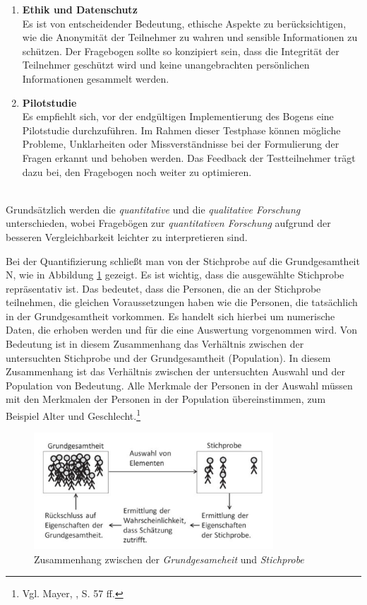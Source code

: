 \begin{enumerate}
    \item \textbf{Ethik und Datenschutz}\\
    Es ist von entscheidender Bedeutung, ethische Aspekte zu berücksichtigen, wie die Anonymität der Teilnehmer zu wahren
    und sensible Informationen zu schützen. Der Fragebogen sollte so konzipiert sein, dass die Integrität der Teilnehmer
    geschützt wird und keine unangebrachten persönlichen Informationen gesammelt werden.

    \item \textbf{Pilotstudie}\\
    Es empfiehlt sich, vor der endgültigen Implementierung des Bogens eine Pilotstudie durchzuführen. Im Rahmen
    dieser Testphase können mögliche Probleme, Unklarheiten oder Missverständnisse bei der Formulierung der Fragen erkannt
    und behoben werden. Das Feedback der Testteilnehmer trägt dazu bei, den Fragebogen noch weiter zu optimieren.
\end{enumerate}
\\

Grundsätzlich werden die \textit{quantitative} und die \textit{qualitative Forschung} unterschieden, wobei Fragebögen zur
\textit{quantitativen Forschung} aufgrund der besseren Vergleichbarkeit leichter zu interpretieren sind.

Bei der Quantifizierung schließt man von der Stichprobe auf die Grundgesamtheit N, wie in Abbildung \ref{fig:GrundgesamtheitStichprobe}
gezeigt. Es ist wichtig, dass die ausgewählte Stichprobe repräsentativ ist. Das bedeutet, dass die Personen, die an der
Stichprobe teilnehmen, die gleichen Voraussetzungen haben wie die Personen, die tatsächlich in der Grundgesamtheit vorkommen.
Es handelt sich hierbei um numerische Daten, die erhoben werden und für die eine Auswertung vorgenommen wird. Von Bedeutung
ist in diesem Zusammenhang das Verhältnis zwischen der untersuchten Stichprobe und der Grundgesamtheit (Population). In
diesem Zusammenhang ist das Verhältnis zwischen der untersuchten Auswahl und der Population von Bedeutung. Alle Merkmale
der Personen in der Auswahl müssen mit den Merkmalen der Personen in der Population übereinstimmen, zum Beispiel Alter
und Geschlecht.\footnote{Vgl. Mayer, \cite{Interview und schriftliche Befragung}, S. 57 ff.}

\begin{figure}[H]
    \centering
    \includegraphics[width=0.8\textwidth]{images/zsmhGrundStich}
    \caption{Zusammenhang zwischen der \textit{Grundgesameheit} und \textit{Stichprobe}\protect\footnotemark}
    \label{fig:GrundgesamtheitStichprobe}
\end{figure}

